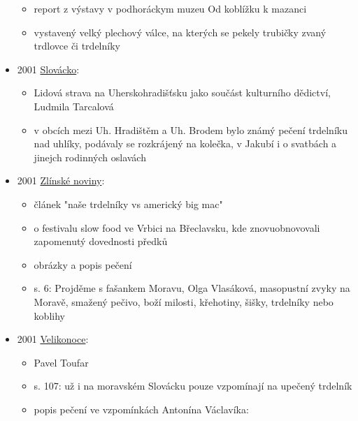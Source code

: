 \begin{itemize}
  \begin{itemize}
  \tightlist
  \item
    report z výstavy v podhoráckym muzeu Od koblížku k mazanci
  \item
    vystavený velký plechový válce, na kterých se pekely trubičky zvaný
    trdlovce či trdelníky
  \end{itemize}
\item
  2001
  \href{https://ceskadigitalniknihovna.cz/view/uuid:a9321c14-1021-43dc-8103-3032373856fa?page=uuid\%3A85bc7b46-bf59-11ed-9fa2-001b63bd97ba&source=kfbz}{Slovácko}:

  \begin{itemize}
  \tightlist
  \item
    Lidová strava na Uherskohradišťsku jako součást kulturního dědictví,
    Ludmila Tarcalová
  \item
    v obcích mezi Uh. Hradištěm a Uh. Brodem bylo známý pečení trdelníku
    nad uhlíky, podávaly se rozkrájený na kolečka, v Jakubí i o svatbách
    a jinejch rodinných oslavách
  \end{itemize}
\item
  2001
  \href{https://ceskadigitalniknihovna.cz/view/uuid:322e701c-2381-435e-a7c8-e76568ab8a64?page=uuid:edf52cea-b1b8-11ed-8d8c-001b63bd97ba&fulltext=trdeln\%C3\%ADk\%20OR\%20trdeln\%C3\%ADky\%20OR\%20trdeln\%C3\%ADku\%20&source=kfbz}{Zlínské
  noviny}:

  \begin{itemize}
  \tightlist
  \item
    článek "naše trdelníky vs americký big mac"
  \item
    o festivalu slow food ve Vrbici na Břeclavsku, kde znovuobnovovali
    zapomenutý dovednosti předků
  \item
    obrázky a popis pečení
  \item
    s. 6: Projděme s fašankem Moravu, Olga Vlasáková, masopustní zvyky
    na Moravě, smažený pečivo, boží milosti, křehotiny, šišky, trdelníky
    nebo koblihy
  \end{itemize}
\item
  2001
  \href{https://ceskadigitalniknihovna.cz/uuid/uuid:34c2b160-28d1-11e7-9efd-005056827e52}{Velikonoce}:

  \begin{itemize}
  \tightlist
  \item
    Pavel Toufar
  \item
    s. 107: už i na moravském Slovácku pouze vzpomínají na upečený
    trdelník
  \item
    popis pečení ve vzpomínkách Antonína Václavíka:


\end{itemize}
\end{itemize}
